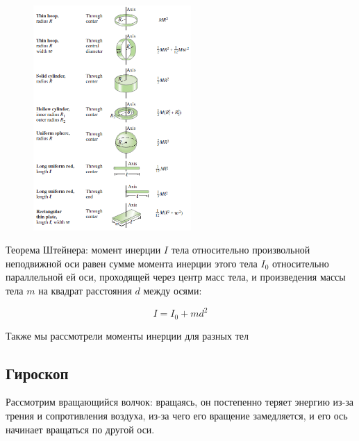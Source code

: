 \documentclass[12pt]{article}
\begin{document}
    \smallvspace
    
    \begin{minipage}{\textwidth}
        \begin{figure}
            \includegraphics[width=6cm]{physics1/images/physics1_2024_10_14_1}
        \end{figure}

        Теорема Штейнера: момент инерции $I$ тела относительно произвольной неподвижной оси равен сумме момента инерции этого тела 
        $I_0$ относительно параллельной ей оси, проходящей через центр масс тела, и произведения массы тела $m$ на квадрат расстояния 
        $d$ между осями:

        \[I = I_0 + md^2\]

        Также мы рассмотрели моменты инерции для разных тел

        \subsection{Гироскоп}

        Рассмотрим вращающийся волчок: вращаясь, он постепенно теряет энергию из-за трения и сопротивления воздуха, из-за чего
        его вращение замедляется, и его ось начинает вращаться по другой оси. 
    \end{minipage}
        
\end{document}

